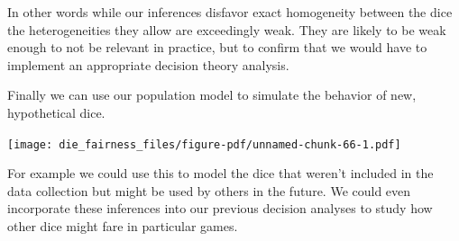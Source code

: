 \documentclass[
  letterpaper,
  DIV=11,
  numbers=noendperiod]{scrartcl}
\newenvironment{Shaded}{\begin{snugshade}}{\end{snugshade}}
\newcommand{\AttributeTok}[1]{\textcolor[rgb]{0.40,0.45,0.13}{#1}}
\newcommand{\ControlFlowTok}[1]{\textcolor[rgb]{0.00,0.23,0.31}{#1}}
\newcommand{\DecValTok}[1]{\textcolor[rgb]{0.68,0.00,0.00}{#1}}
\newcommand{\FloatTok}[1]{\textcolor[rgb]{0.68,0.00,0.00}{#1}}
\newcommand{\FunctionTok}[1]{\textcolor[rgb]{0.28,0.35,0.67}{#1}}
\newcommand{\NormalTok}[1]{\textcolor[rgb]{0.00,0.23,0.31}{#1}}
\newcommand{\OtherTok}[1]{\textcolor[rgb]{0.00,0.23,0.31}{#1}}
\newcommand{\SpecialCharTok}[1]{\textcolor[rgb]{0.37,0.37,0.37}{#1}}
\newcommand{\StringTok}[1]{\textcolor[rgb]{0.13,0.47,0.30}{#1}}
\begin{document}
In other words while our inferences disfavor exact homogeneity between
the dice the heterogeneities they allow are exceedingly weak. They are
likely to be weak enough to not be relevant in practice, but to confirm
that we would have to implement an appropriate decision theory analysis.

Finally we can use our population model to simulate the behavior of new,
hypothetical dice.

\begin{Shaded}
\end{Shaded}

\texttt{[image: die\_fairness\_files/figure-pdf/unnamed-chunk-66-1.pdf]}

For example we could use this to model the dice that weren't included in
the data collection but might be used by others in the future. We could
even incorporate these inferences into our previous decision analyses to
study how other dice might fare in particular games.
\end{document}
